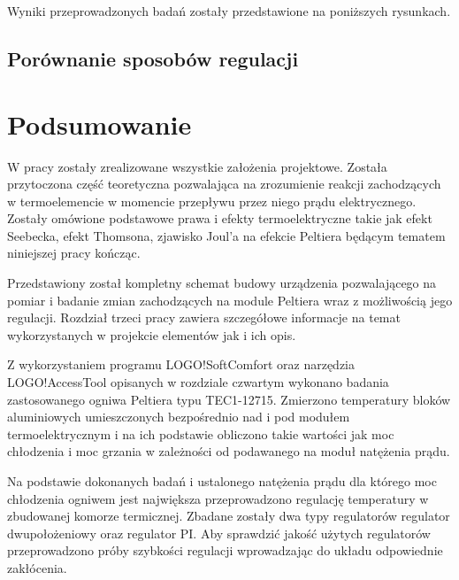 \documentclass[oneside]{mgr}
\begin{document}
Wyniki przeprowadzonych badań zostały przedstawione na poniższych rysunkach.
\section{Porównanie sposobów regulacji}

\chapter{Podsumowanie}
W pracy zostały zrealizowane wszystkie założenia projektowe. Została przytoczona część teoretyczna pozwalająca na zrozumienie reakcji zachodzących w termoelemencie w momencie przepływu przez niego prądu elektrycznego. Zostały omówione podstawowe prawa i efekty termoelektryczne takie jak efekt Seebecka, efekt Thomsona, zjawisko Joul'a na efekcie Peltiera będącym tematem niniejszej pracy kończąc.

Przedstawiony został kompletny schemat budowy urządzenia pozwalającego na pomiar i badanie zmian zachodzących na module Peltiera wraz z możliwością jego regulacji. Rozdział trzeci pracy zawiera szczegółowe informacje na temat wykorzystanych w projekcie elementów jak i ich opis.

Z wykorzystaniem programu LOGO!SoftComfort oraz narzędzia  LOGO!AccessTool opisanych w rozdziale czwartym wykonano badania zastosowanego ogniwa Peltiera typu TEC1-12715. Zmierzono temperatury bloków aluminiowych umieszczonych bezpośrednio nad i pod modułem termoelektrycznym i na ich podstawie obliczono takie wartości jak moc chłodzenia i moc grzania w zależności od podawanego na moduł natężenia prądu.

Na podstawie dokonanych badań i ustalonego natężenia prądu dla którego moc chłodzenia ogniwem jest największa przeprowadzono regulację temperatury w zbudowanej komorze termicznej. Zbadane zostały dwa typy regulatorów regulator dwupołożeniowy oraz regulator PI. Aby sprawdzić jakość użytych regulatorów przeprowadzono próby szybkości regulacji wprowadzając do układu odpowiednie zakłócenia.
\end{document}
